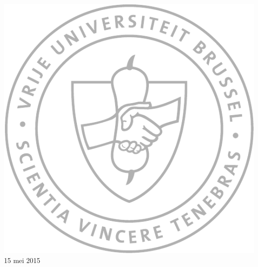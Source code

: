 \begin{titlepage}
\vspace{0.6cm}

\includegraphics[scale=0.4]{VUB_schild.pdf}\\[0.5cm]

{\large 15 mei 2015}
\vfill %

\end{titlepage}